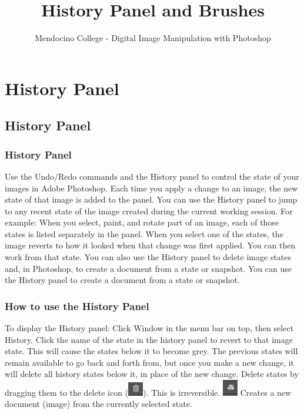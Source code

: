\documentclass{beamer}
\title{History Panel and Brushes}
\author{Mendocino College - Digital Image Manipulation with Photoshop}
\date{\vspace{-5em}}
\begin{document}
	{
		\begin{frame}
			\vspace{-35pt}
			\maketitle
		\end{frame}
	}
		
		
\section{History Panel}

\subsection{History Panel}		

	\begin{frame}
		\frametitle{History Panel}
		\begin{outline}
			\1 Use the Undo/Redo commands and the History panel to control the state of your images in Adobe Photoshop.
			\1 Each time you apply a change to an image, the new state of that image is added to the panel.
			\1 You can use the History panel to jump to any recent state of the image created during the current working session.
			\1 For example:  When you select, paint, and rotate part of an image, each of those states is listed separately in the panel.
			\2 When you select one of the states, the image reverts to how it looked when that change was first applied. 
			\2 You can then work from that state.
			\1 You can also use the History panel to delete image states and, in Photoshop, to create a document from a state or snapshot.
			\1 You can use the History panel to create a document from a state or snapshot.
		\end{outline}
	\end{frame}

	\begin{frame}
	\frametitle{How to use the History Panel}
	\begin{outline}
		\1 To display the History panel: 
		\2 Click Window in the menu bar on top, 
		\2 then select History. 
		\1 Click the name of the state in the history panel to revert to that image state.
		\2 This will cause the states below it to become grey.
		\2 The previous states will remain available to go back and forth from,
		\2 but once you make a new change, it will delete all history states below it, in place of the new change.
		\1 Delete states by dragging them to the delete icon (\includegraphics[width=0.05\textwidth]{images/history panel - trash bin.PNG}).
		\2 This is irreversible.    
		\1 \includegraphics[width=0.05\textwidth]{images/history panel - create new document from current state.png} Creates a new document (image) from the currently selected state.
	\end{outline}
\end{frame}
\end{document}
